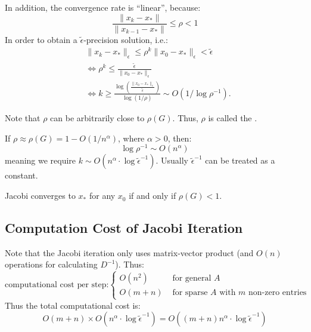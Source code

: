 \documentclass[../main/main.tex]{subfiles}
\begin{document}
In addition, the convergence rate is ``linear'', because: \[
\frac{\|x_{k}-x_{*}\|}{\|x_{k-1}-x_{*}\|}\leq \rho < 1
\]
In order to obtain a $\tilde{\epsilon}$-precision solution, i.e.: \begin{align*}
&                                                                    \|x_{k}-x_{*}\|_{\epsilon}\leq \rho^{k}\|x_{0}-x_{*}\|_{\epsilon}< \tilde{\epsilon}\\
                                                                    &\iff \rho^{k}\leq \frac{\tilde{\epsilon}}{\|x_{0}-x_{*}\|_{\epsilon}}\\
    &\iff k\geq \frac{\log\left(\frac{\|x_{0}-x_{*}\|_{\epsilon}}{\tilde{\epsilon}} \right)}{\log(1 / \rho)} \sim O(1 / \log \rho ^{-1})
                                                                    .\end{align*}
\begin{remark}
  Note that $\rho$ can be arbitrarily close to $\rho(G)$. Thus, $\rho$ is called the .
\end{remark}
\begin{remark}
  If $\rho \approx \rho(G)= 1-O(1 / n^{\alpha})$, where $\alpha > 0$, then: \[
    \log \rho^{-1}\sim O(n^{\alpha})
  \] meaning we require $k\sim O(n^{\alpha}\cdot\log \tilde{\epsilon}^{-1})$. Usually $\tilde{\epsilon}^{-1}$ can be treated as a constant.
\end{remark}
\begin{corollary}
Jacobi converges to $x_{*}$ for any $x_{0}$ if and only if $\rho(G) < 1$.
\end{corollary}

\subsection{Computation Cost of Jacobi Iteration}
Note that the Jacobi iteration only uses matrix-vector product (and $O(n)$ operations for calculating $D^{-1}$). Thus: \[
  \text{computational cost per step:}
\begin{cases}
  O(n^2)& \text{ for general $A$ } \\
  O(m+n)&\text{ for sparse $A$ with $m$ non-zero entries}
\end{cases}
\]
Thus the total computational cost is: \[
O(m+n)\times O(n^{\alpha}\cdot \log \tilde{\epsilon}^{-1}) = O((m+n)n^{\alpha}\cdot \log \tilde{\epsilon}^{-1})
\]
\end{document}
